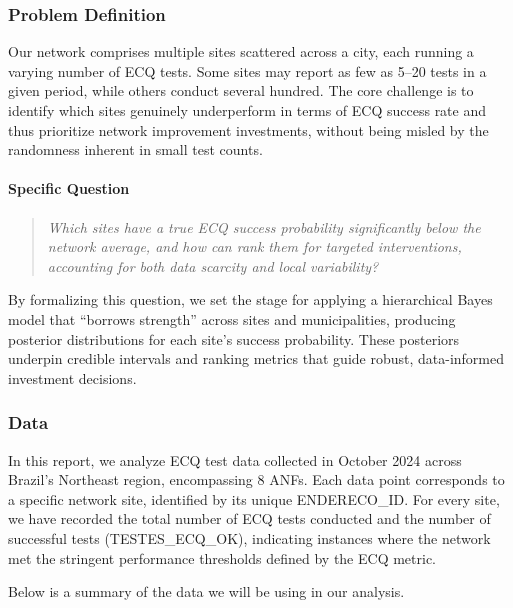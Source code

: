 \documentclass[
]{article}
\begin{document}
\hypertarget{problem-definition}{%
\subsubsection{Problem Definition}\label{problem-definition}}

Our network comprises multiple sites scattered across a city, each
running a varying number of ECQ tests. Some sites may report as few as
5--20 tests in a given period, while others conduct several hundred. The
core challenge is to identify which sites genuinely underperform in
terms of ECQ success rate and thus prioritize network improvement
investments, without being misled by the randomness inherent in small
test counts.

\hypertarget{specific-question}{%
\paragraph{Specific Question}\label{specific-question}}

\begin{quote}
\emph{Which sites have a true ECQ success probability significantly
below the network average, and how can rank them for targeted
interventions, accounting for both data scarcity and local variability?}
\end{quote}

By formalizing this question, we set the stage for applying a
hierarchical Bayes model that ``borrows strength'' across sites and
municipalities, producing posterior distributions for each site's
success probability. These posteriors underpin credible intervals and
ranking metrics that guide robust, data-informed investment decisions.

\hypertarget{data}{%
\subsubsection{Data}\label{data}}

In this report, we analyze ECQ test data collected in October 2024
across Brazil's Northeast region, encompassing 8 ANFs. Each data point
corresponds to a specific network site, identified by its unique
ENDERECO\_ID. For every site, we have recorded the total number of ECQ
tests conducted and the number of successful tests (TESTES\_ECQ\_OK),
indicating instances where the network met the stringent performance
thresholds defined by the ECQ metric.

Below is a summary of the data we will be using in our analysis.
\end{document}
